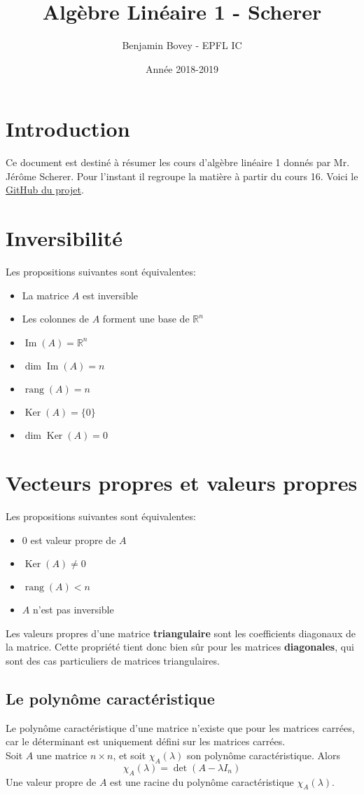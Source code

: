 \documentclass{article}
\title{Algèbre Linéaire 1 - Scherer}
\author{Benjamin Bovey -  EPFL IC}
\date{Année 2018-2019}
\DeclareMathOperator{\rang}{rang}
\DeclareMathOperator{\im}{Im}
\DeclareMathOperator{\ke}{Ker}
\begin{document}
\maketitle

\section*{Introduction}
Ce document est destiné à résumer les cours d'algèbre linéaire 1 donnés par Mr. Jérôme Scherer. Pour l'instant il regroupe la matière à partir du cours 16. Voici le \href{https://github.com/Arakniode/almighty-handbook-of-sleep-deprived-student}{GitHub du projet}.

\section{Inversibilité}
Les propositions suivantes sont équivalentes:
\begin{itemize}
	\item La matrice \(A\) est inversible
	\item Les colonnes de \(A\) forment une base de \(\mathbb{R}^n\)
	\item \(\im(A) = \mathbb{R}^n\)
	\item \(\dim \im(A) = n\)
	\item \(\rang(A) = n\)
	\item \(\ke(A) = \{0\}\)
	\item \(\dim \ke(A) = 0\)
\end{itemize}

\section{Vecteurs propres et valeurs propres}
Les propositions suivantes sont équivalentes:
\begin{itemize}
	\item \(0\) est valeur propre de \(A\)
	\item \(\ke(A) \neq 0\)
	\item \(\rang(A) < n\)
	\item \(A\) n'est pas inversible
\end{itemize}
Les valeurs propres d'une matrice \textbf{triangulaire} sont les coefficients diagonaux de la matrice. Cette propriété tient donc bien sûr pour les matrices \textbf{diagonales}, qui sont des cas particuliers de matrices triangulaires.
\subsection{Le polynôme caractéristique}
Le polynôme caractéristique d'une matrice n'existe que pour les matrices carrées, car le déterminant est uniquement défini sur les matrices carrées. \\
Soit \(A\) une matrice \(n \times n\), et soit \(\chi_A(\lambda)\) son polynôme caractéristique. Alors
\begin{equation}
	\chi_A(\lambda) = \det(A-\lambda I_n)
\end{equation}
Une valeur propre de \(A\) est une racine du polynôme caractéristique \(\chi_A(\lambda)\). 
\end{document}
